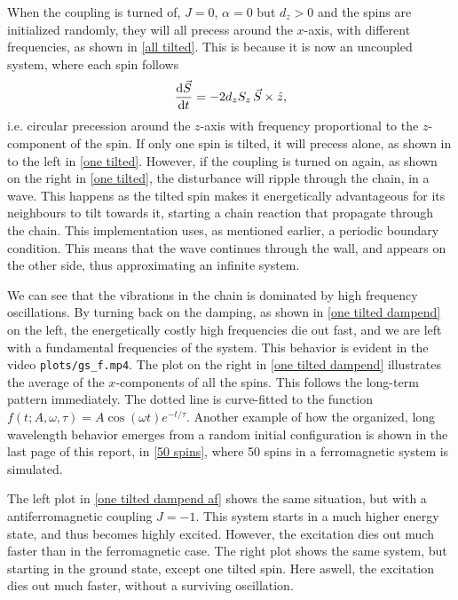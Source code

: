\documentclass{article}
\begin{document}
    When the coupling is turned of, $J = 0$, $\alpha=0$ but $d_z>0$ and the spins are initialized randomly, they will all precess around the $x$-axis, with different frequencies, as shown in \autoref{all tilted}.
    This is because it is now an uncoupled system, where each spin follows 
    \begin{equation*}
        \dv{\vec S}{t} = - 2 d_z S_z \,\vec S \times \hat z, 
    \end{equation*}
    i.e.
    circular precession around the $z$-axis with frequency proportional to the $z$-component of the spin.
    If only one spin is tilted, it will precess alone, as shown in to the left in \autoref{one tilted}.
    However, if the coupling is turned on again, as shown on the right in \autoref{one tilted}, the disturbance will ripple through the chain, in a wave.
    This happens as the tilted spin makes it energetically advantageous for its neighbours to tilt towards it, starting a chain reaction that propagate through the chain. This implementation uses, as mentioned earlier, a periodic boundary condition. This means that the wave continues through the wall, and appears on the other side, thus approximating an infinite system.

    We can see that the vibrations in the chain is dominated by high frequency oscillations.
    By turning back on the damping, as shown in \autoref{one tilted dampend} on the left, the energetically costly high frequencies die out fast, and we are left with a fundamental frequencies of the system.
    This behavior is evident in the video \verb|plots/gs_f.mp4|.
    The plot on the right in \autoref{one tilted dampend} illustrates the average of the $x$-components of all the spins.
    This follows the long-term pattern immediately.
    The dotted line is curve-fitted to the function $f(t; A, \omega, \tau) = A \cos(\omega t) e^{-t/\tau}$.
    Another example of how the organized, long wavelength behavior emerges from a random initial configuration is shown in the last page of this report, in \autoref{50 spins}, where 50 spins in a ferromagnetic system is simulated.

    The left plot in \autoref{one tilted dampend af} shows the same situation, but with a antiferromagnetic coupling $J = -1$.
    This system starts in a much higher energy state, and thus becomes highly excited.
    However, the excitation dies out much faster than in the ferromagnetic case.
    The right plot shows the same system, but starting in the ground state, except one tilted spin.
    Here aswell, the excitation dies out much faster, without a surviving oscillation.
\end{document}
